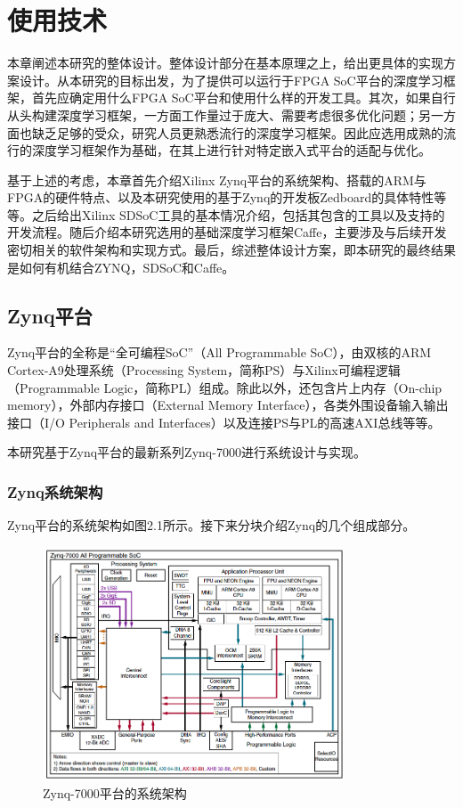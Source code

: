 
\chapter{使用技术}

本章阐述本研究的整体设计。整体设计部分在基本原理之上，给出更具体的实现方案设计。从本研究的目标出发，为了提供可以运行于FPGA SoC平台的深度学习框架，首先应确定用什么FPGA SoC平台和使用什么样的开发工具。其次，如果自行从头构建深度学习框架，一方面工作量过于庞大、需要考虑很多优化问题；另一方面也缺乏足够的受众，研究人员更熟悉流行的深度学习框架。因此应选用成熟的流行的深度学习框架作为基础，在其上进行针对特定嵌入式平台的适配与优化。

基于上述的考虑，本章首先介绍Xilinx Zynq平台的系统架构、搭载的ARM与FPGA的硬件特点、以及本研究使用的基于Zynq的开发板Zedboard的具体特性等等。之后给出Xilinx SDSoC工具的基本情况介绍，包括其包含的工具以及支持的开发流程。随后介绍本研究选用的基础深度学习框架Caffe，主要涉及与后续开发密切相关的软件架构和实现方式。最后，综述整体设计方案，即本研究的最终结果是如何有机结合ZYNQ，SDSoC和Caffe。

\section{Zynq平台}

Zynq平台的全称是“全可编程SoC”（All Programmable SoC）\supercite{ds190}，由双核的ARM Cortex-A9处理系统（Processing System，简称PS）与Xilinx可编程逻辑（Programmable Logic，简称PL）组成。除此以外，还包含片上内存（On-chip memory），外部内存接口（External Memory Interface），各类外围设备输入输出接口（I/O Peripherals and Interfaces）以及连接PS与PL的高速AXI总线等等。

本研究基于Zynq平台的最新系列Zynq-7000进行系统设计与实现。

\subsection{Zynq系统架构}

Zynq平台的系统架构如图2.1所示。接下来分块介绍Zynq的几个组成部分。

\begin{figure}[!ht]
\centering
	\includegraphics[width=0.8\textwidth]{assets/imgs/zynq-7000}
\caption{Zynq-7000平台的系统架构}
\end{figure}

